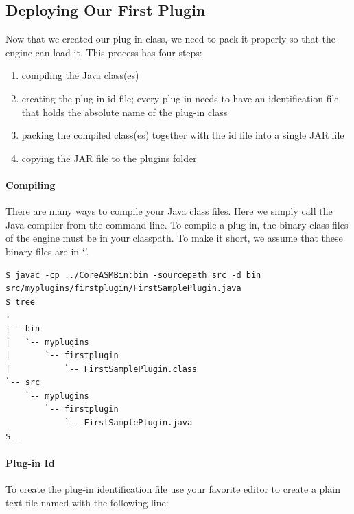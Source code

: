 \documentclass{article}
\begin{document}
\subsection{Deploying Our First Plugin}

Now that we created our plug-in class, we need to pack it properly so that the \CoreASM engine
can load it. This process has four steps:
\begin{enumerate}
	\item compiling the Java class(es)
	\item creating the plug-in id file; every \CoreASM plug-in needs to have an identification 
		file that holds the absolute name of the plug-in class 
	\item packing the compiled class(es) together with the id file into a single JAR file
	\item copying the JAR file to the \CoreASM plugins folder 
\end{enumerate} 

\paragraph{Compiling} There are many ways to compile your Java class files. Here we simply call the 
Java compiler from the command line. To compile a plug-in, the binary class files of the \CoreASM engine
must be in your classpath. To make it short, we assume that these binary files are in `'.

\begin{shell}
\begin{verbatim}
$ javac -cp ../CoreASMBin:bin -sourcepath src -d bin src/myplugins/firstplugin/FirstSamplePlugin.java
$ tree 
.
|-- bin
|   `-- myplugins
|       `-- firstplugin
|           `-- FirstSamplePlugin.class
`-- src
    `-- myplugins
        `-- firstplugin
            `-- FirstSamplePlugin.java
$ _
\end{verbatim}
\end{shell}

\paragraph{Plug-in Id} To create the plug-in identification file use your favorite editor to 
create a plain text file named  with the following line:

\begin{center}\end{center}
\end{document}
